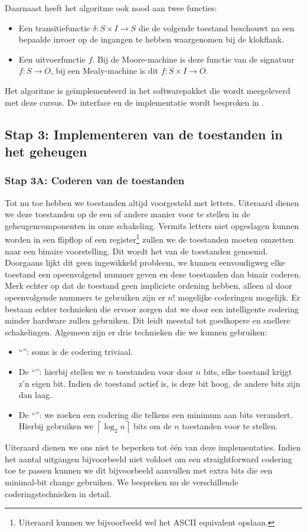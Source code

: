 Daarnaast heeft het algoritme ook nood aan twee functies:
\begin{itemize}
 \item Een transitiefunctie $\delta:S\times I\rightarrow S$ die de volgende toestand beschouwt na een bepaalde invoer op de ingangen te hebben waargenomen bij de klokflank.
 \item Een uitvoerfunctie $f$. Bij de Moore-machine is deze functie van de signatuur $f:S\rightarrow O$, bij een Mealy-machine is dit $f:S\times I\rightarrow O$.
\end{itemize}
Het algoritme is ge\"implementeerd in het softwarepakket die wordt meegeleverd met deze cursus. De interface en de implementatie wordt besproken in .
\subsection{Stap 3: Implementeren van de toestanden in het geheugen}
\subsubsection{Stap 3A: Coderen van de toestanden}
\label{term:minimalBitChange}
\label{term:grayCodeCounter}
Tot nu toe hebben we toestanden altijd voorgesteld met letters. Uiteraard dienen we deze toestanden op de een of andere manier voor te stellen in de geheugencomponenten in onze schakeling. Vermits letters niet opgeslagen kunnen worden in een flipflop of een register\footnote{Uiteraard kunnen we bijvoorbeeld wel het ASCII equivalent opslaan.} zullen we de toestanden moeten omzetten naar een binaire voorstelling. Dit wordt het  van de toestanden genoemd. Doorgaans lijkt dit geen ingewikkeld probleem, we kunnen eenvoudigweg elke toestand een opeenvolgend nummer geven en deze toestanden dan binair coderen. Merk echter op dat de toestand geen impliciete ordening hebben, alleen al door opeenvolgende nummers te gebruiken zijn er $n!$ mogelijke coderingen mogelijk. Er bestaan echter technieken die ervoor zorgen dat we door een intelligente codering minder hardware zullen gebruiken. Dit leidt meestal tot goedkopere en snellere schakelingen. Algemeen zijn er drie technieken die we kunnen gebruiken:
\begin{itemize}
 \item ``'': soms is de codering triviaal.
 \item De ``'': hierbij stellen we $n$ toestanden voor door $n$ bits, elke toestand krijgt z'n eigen bit. Indien de toestand actief is, is deze bit hoog, de andere bits zijn dan laag.
 \item De ``'': we zoeken een codering die telkens een minimum aan bits verandert. Hierbij gebruiken we $\left\lceil\log_2 n\right\rceil$ bits om de $n$ toestanden voor te stellen.
\end{itemize}
Uiteraard dienen we ons niet te beperken tot \'e\'en van deze implementaties. Indien het aantal uitgangen bijvoorbeeld niet voldoet om een straightforward codering toe te passen kunnen we dit bijvoorbeeld aanvullen met extra bits die een minimal-bit change gebruiken. We bespreken nu de verschillende coderingstechnieken in detail.

